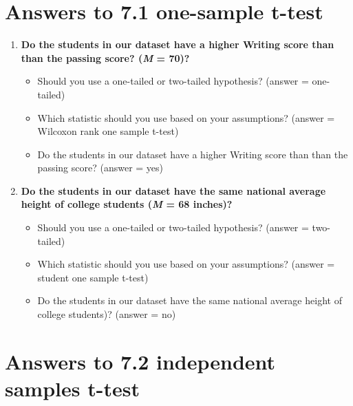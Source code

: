 \documentclass[
]{book}
\begin{document}
\hypertarget{answers-to-7.1-one-sample-t-test}{%
\section{Answers to 7.1 one-sample t-test}\label{answers-to-7.1-one-sample-t-test}}

\begin{enumerate}
\def\labelenumi{\arabic{enumi}.}
\item
  \textbf{Do the students in our dataset have a higher Writing score than than the passing score? (\emph{M} = 70)?}

  \begin{itemize}
  \item
    Should you use a one-tailed or two-tailed hypothesis? (answer = one-tailed)
  \item
    Which statistic should you use based on your assumptions? (answer = Wilcoxon rank one sample t-test)
  \item
    Do the students in our dataset have a higher Writing score than than the passing score? (answer = yes)
  \end{itemize}
\item
  \textbf{Do the students in our dataset have the same national average height of college students (\emph{M} = 68 inches)?}

  \begin{itemize}
  \item
    Should you use a one-tailed or two-tailed hypothesis? (answer = two-tailed)
  \item
    Which statistic should you use based on your assumptions? (answer = student one sample t-test)
  \item
    Do the students in our dataset have the same national average height of college students)? (answer = no)
  \end{itemize}
\end{enumerate}

\hypertarget{answers-to-7.2-independent-samples-t-test}{%
\section{Answers to 7.2 independent samples t-test}\label{answers-to-7.2-independent-samples-t-test}}
\end{document}
